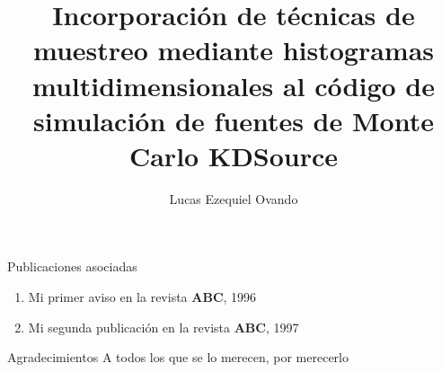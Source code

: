 \documentclass[12pt,screen,twoside,pagebackref]{ibtesis}
\title{Incorporación de técnicas de muestreo mediante histogramas multidimensionales al código de
simulación de fuentes de Monte Carlo KDSource}
\author{Lucas Ezequiel Ovando}
\begin{document}

\begin{preliminary}



\begin{abreviaturas}
\end{abreviaturas}

\tableofcontents                %

\listoffigures                  %

\listoftables                   %



\end{preliminary}




% 



\appendix


\begin{biblio}

\end{biblio}


\begin{postliminary}

\begin{seccion}{Publicaciones asociadas}
  \begin{enumerate}
  \item Mi primer aviso en la revista \textbf{ABC}, 1996
  \item Mi segunda publicaci\'{o}n en la revista \textbf{ABC}, 1997
  \end{enumerate}
\end{seccion}

\begin{seccion}{Agradecimientos}
A todos los que se lo merecen, por merecerlo
\end{seccion}

\end{postliminary}
\end{document}
